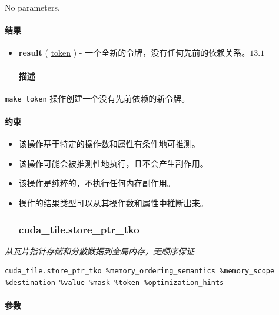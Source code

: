 \documentclass{article}
\begin{document}
No parameters.



\paragraph{结果}

\begin{itemize}
\item \textbf{result} ( \href{https://docs.nvidia.com/cuda/tile-ir/latest/sections/operations.html#type-token}{token} ) - 一个全新的令牌，没有任何先前的依赖关系。$\boxed{13.1}$


\paragraph{描述}

\end{itemize}
\texttt{make\_token} 操作创建一个没有先前依赖的新令牌。



\paragraph{约束}

\begin{itemize}
\item 该操作基于特定的操作数和属性有条件地可推测。
\item 该操作可能会被推测性地执行，且不会产生副作用。
\item 该操作是纯粹的，不执行任何内存副作用。
\item 操作的结果类型可以从其操作数和属性中推断出来。


\subsubsection{cuda\_tile.store\_ptr\_tko}

\end{itemize}
\textit{从瓦片指针存储和分散数据到全局内存，无顺序保证}


\begin{lstlisting}
cuda_tile.store_ptr_tko %memory_ordering_semantics %memory_scope %destination %value %mask %token %optimization_hints
\end{lstlisting}

\paragraph{参数}
\end{document}
